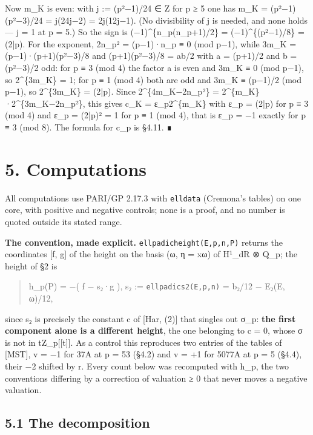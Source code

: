\documentclass[11pt,a4paper]{article}
\theoremstyle{named}
\begin{document}
Now m\_K is even: with j := (p²−1)/24 ∈ Z for p ≥ 5 one has m\_K = (p²−1)(p²−3)/24 = j(24j−2) = 2j(12j−1). (No divisibility of j is needed, and none holds — j = 1 at p = 5.) So the sign is (−1)\textasciicircum{}\{n\_p(n\_p+1)/2\} = (−1)\textasciicircum{}\{(p²−1)/8\} = (2|p). For the exponent, 2n\_p² = (p−1)·n\_p ≡ 0 (mod p−1), while 3m\_K = (p−1)·(p+1)(p²−3)/8 and (p+1)(p²−3)/8 = ab/2 with a = (p+1)/2 and b = (p²−3)/2 odd: for p ≡ 3 (mod 4) the factor a is even and 3m\_K ≡ 0 (mod p−1), so 2\textasciicircum{}\{3m\_K\} = 1; for p ≡ 1 (mod 4) both are odd and 3m\_K ≡ (p−1)/2 (mod p−1), so 2\textasciicircum{}\{3m\_K\} = (2|p). Since 2\textasciicircum{}\{4m\_K−2n\_p²\} = 2\textasciicircum{}\{m\_K\}·2\textasciicircum{}\{3m\_K−2n\_p²\}, this gives c\_K = ε\_p2\textasciicircum{}\{m\_K\} with ε\_p = (2|p) for p ≡ 3 (mod 4) and ε\_p = (2|p)² = 1 for p ≡ 1 (mod 4), that is ε\_p = −1 exactly for p ≡ 3 (mod 8). The formula for c\_p is §4.11. ∎

\section*{5. Computations}

All computations use PARI/GP 2.17.3 with \texttt{elldata} (Cremona's tables) on one core, with positive and negative controls; none is a proof, and no number is quoted outside its stated range.

\textbf{The convention, made explicit.} \texttt{ellpadicheight(E,p,n,P)} returns the coordinates [f, g] of the height on the basis (ω, η = xω) of H¹\_dR ⊗ Q\_p; the height of §2 is

\begin{quote}
h\_p(P) = −( f − s₂·g ),  s₂ := \texttt{ellpadics2(E,p,n)} = b₂/12 − E₂(E, ω)/12,
\end{quote}

since s₂ is precisely the constant c of [Har, (2)] that singles out σ\_p: \textbf{the first component alone is a different height}, the one belonging to c = 0, whose σ is not in tZ\_p[[t]]. As a control this reproduces two entries of the tables of [MST], v = −1 for 37A at p = 53 (§4.2) and v = +1 for 5077A at p = 5 (§4.4), their −2 shifted by r. Every count below was recomputed with h\_p, the two conventions differing by a correction of valuation ≥ 0 that never moves a negative valuation.

\subsection*{5.1 The decomposition}
\end{document}
